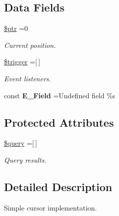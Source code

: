 \subsection*{Data Fields}
\begin{DoxyCompactItemize}
\item 
\hypertarget{class_d_b_1_1_cursor_a18682bea3799d50bb3a0cc3d049dca07}{}\label{class_d_b_1_1_cursor_a18682bea3799d50bb3a0cc3d049dca07} 
\hyperlink{class_d_b_1_1_cursor_a18682bea3799d50bb3a0cc3d049dca07}{\$ptr} =0
\begin{DoxyCompactList}\small\item\em Current position. \end{DoxyCompactList}\item 
\hypertarget{class_d_b_1_1_cursor_ae4c540bb943eedf48dbc7d06b2994a05}{}\label{class_d_b_1_1_cursor_ae4c540bb943eedf48dbc7d06b2994a05} 
\hyperlink{class_d_b_1_1_cursor_ae4c540bb943eedf48dbc7d06b2994a05}{\$trigger} =\mbox{[}$\,$\mbox{]}
\begin{DoxyCompactList}\small\item\em Event listeners. \end{DoxyCompactList}\end{DoxyCompactItemize}
{\bf }\par
\begin{DoxyCompactItemize}
\item 
\hypertarget{class_d_b_1_1_cursor_aa2e3f553fd1f1c2053bc084118c10396}{}\label{class_d_b_1_1_cursor_aa2e3f553fd1f1c2053bc084118c10396} 
const {\bfseries E\+\_\+\+Field} =\textquotesingle{}Undefined field \%s\textquotesingle{}
\end{DoxyCompactItemize}

\subsection*{Protected Attributes}
\begin{DoxyCompactItemize}
\item 
\hypertarget{class_d_b_1_1_cursor_af59a5f7cd609e592c41dc3643efd3c98}{}\label{class_d_b_1_1_cursor_af59a5f7cd609e592c41dc3643efd3c98} 
\hyperlink{class_d_b_1_1_cursor_af59a5f7cd609e592c41dc3643efd3c98}{\$query} =\mbox{[}$\,$\mbox{]}
\begin{DoxyCompactList}\small\item\em Query results. \end{DoxyCompactList}\end{DoxyCompactItemize}


\subsection{Detailed Description}
Simple cursor implementation. 

